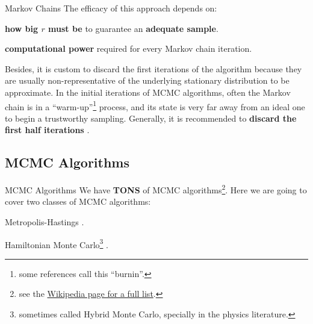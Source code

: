 \begin{frame}{Markov Chains}
	The efficacy of this approach depends on:
	\begin{vfilleditems}
		\item \textbf{how big $r$ must be} to guarantee an \textbf{adequate sample}.
		\item \textbf{computational power} required for every Markov chain iteration.
	\end{vfilleditems}

	\vfill
	\footnotesize
	Besides, it is custom to discard the first iterations of the algorithm because
	they are usually non-representative of the underlying stationary distribution to be approximate.
	In the initial iterations of MCMC algorithms,
	often the Markov chain is in a ``warm-up''\footnote{some references call this ``burnin''.} process,
	and its state is very far away from an ideal one to begin a trustworthy sampling.
	\vfill
	Generally, it is recommended to \textbf{discard the first half iterations} \parencite{gelmanBasicsMarkovChain2013}.
\end{frame}

\subsection{MCMC Algorithms}
\begin{frame}{MCMC Algorithms}
	We have \textbf{TONS} of MCMC algorithms\footnote{see the \href{https://en.wikipedia.org/wiki/Markov_chain_Monte_Carlo}
	{Wikipedia page for a full list}.}.
	Here we are going to cover two classes of MCMC algorithms:
	\begin{vfilleditems}
		\item Metropolis-Hastings \parencite{metropolisEquationStateCalculations1953, hastingsMonteCarloSampling1970}.

		\item Hamiltonian Monte Carlo\footnote{sometimes called Hybrid Monte Carlo, specially in the physics literature.} \parencite{neal2011mcmc, betancourtConceptualIntroductionHamiltonian2017}.
	\end{vfilleditems}
\end{frame}


